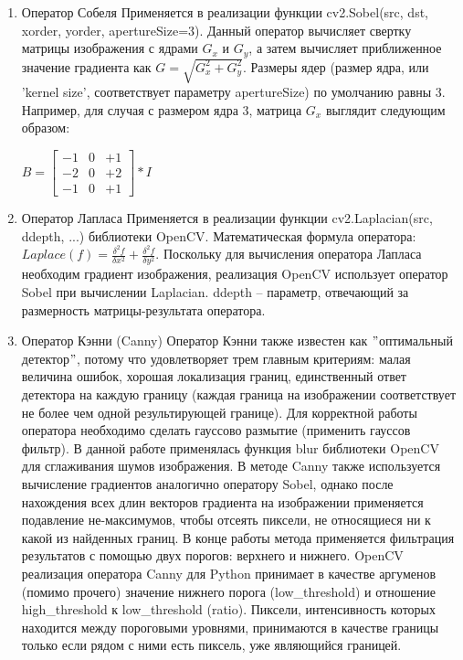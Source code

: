\begin{enumerate}
	\item Оператор Собеля
	\newline
	Применяется в реализации функции cv2.Sobel(src, dst, xorder, yorder, apertureSize=3). Данный оператор вычисляет свертку матрицы изображения с ядрами $G_x$ и $G_y$, а затем вычисляет приближенное значение градиента как $G = \sqrt{G^{2}_x + G^{2}_y}$. Размеры ядер (размер ядра, или 'kernel size', соответствует параметру apertureSize) по умолчанию равны 3.
	\newline Например, для случая с размером ядра 3, матрица $G_x$ выглядит следующим образом: 
	\newline
\begin{center}
		$B = 
	\begin{bmatrix}
		-1 & 0 & +1 \\
		-2 & 0 & +2 \\
		-1 & 0 & +1
	\end{bmatrix} * I$
\end{center}
	\item Оператор Лапласа
	\newline
	Применяется в реализации функции cv2.Laplacian(src, ddepth, ...) библиотеки OpenCV. Математическая формула оператора: $Laplace(f) = \frac{\delta^{2}f}{\delta x^{2}} + \frac{\delta^{2}f}{\delta y^{2}}$.
	\newline
	Поскольку для вычисления оператора Лапласа необходим градиент изображения, реализация OpenCV использует оператор Sobel при вычислении Laplacian. ddepth -- параметр, отвечающий за размерность матрицы-результата оператора.

	\item Оператор Кэнни (Canny)	
	\newline
	Оператор Кэнни также известен как $"$оптимальный детектор$"$, потому что удовлетворяет трем главным критериям: малая величина ошибок, хорошая локализация границ, единственный ответ детектора на каждую границу (каждая граница на изображении соответствует не более чем одной результирующей границе).  
	\newline 
	Для корректной работы оператора необходимо сделать гауссово размытие (применить гауссов фильтр). В данной работе применялась функция blur библиотеки OpenCV для сглаживания шумов изображения.
	\newline
	В методе Canny также используется вычисление градиентов аналогично оператору Sobel, однако после нахождения всех длин векторов градиента на изображении применяется подавление не-максимумов, чтобы отсеять пиксели, не относящиеся ни к какой из найденных границ.
	\newline
	В конце работы метода применяется фильтрация результатов с помощью двух порогов: верхнего и нижнего. OpenCV реализация оператора Canny для Python принимает в качестве аргуменов (помимо прочего) значение нижнего порога (low\_threshold) и отношение high\_threshold к low\_threshold (ratio). Пиксели, интенсивность которых находится между пороговыми уровнями, принимаются в качестве границы только если рядом с ними есть пиксель, уже являющийся границей.
	\newline 
\end{enumerate}


